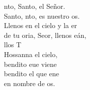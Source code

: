 \begin{cancion}[Santo][Estepa]%
	nto, Santo, el Señor.\\
	Santo, nto, es nuestro os.\\
	\jump
	Llenos en el cielo y la er\\
	de tu oria, Seor, llenos eán,\\
	llos T\\
	\jump
	Hossanna  el cielo, \\
	bendito eue viene\\
	bendito el que ene \\
	en nombre de os.\\
\end{cancion}%
